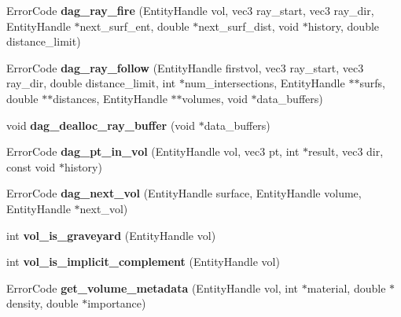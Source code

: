 \begin{DoxyCompactItemize}
\item 
\hypertarget{namespacepyne_a64c30defae1f7780ea4a3e1cb16a7a79}{Error\-Code {\bfseries dag\-\_\-ray\-\_\-fire} (Entity\-Handle vol, vec3 ray\-\_\-start, vec3 ray\-\_\-dir, Entity\-Handle $\ast$next\-\_\-surf\-\_\-ent, double $\ast$next\-\_\-surf\-\_\-dist, void $\ast$history, double distance\-\_\-limit)}\label{namespacepyne_a64c30defae1f7780ea4a3e1cb16a7a79}

\item 
\hypertarget{namespacepyne_afc692d9c804c22e7e6b3a30d2d852296}{Error\-Code {\bfseries dag\-\_\-ray\-\_\-follow} (Entity\-Handle firstvol, vec3 ray\-\_\-start, vec3 ray\-\_\-dir, double distance\-\_\-limit, int $\ast$num\-\_\-intersections, Entity\-Handle $\ast$$\ast$surfs, double $\ast$$\ast$distances, Entity\-Handle $\ast$$\ast$volumes, void $\ast$data\-\_\-buffers)}\label{namespacepyne_afc692d9c804c22e7e6b3a30d2d852296}

\item 
\hypertarget{namespacepyne_a9451bba0ed3cd9857c7452cec04ab031}{void {\bfseries dag\-\_\-dealloc\-\_\-ray\-\_\-buffer} (void $\ast$data\-\_\-buffers)}\label{namespacepyne_a9451bba0ed3cd9857c7452cec04ab031}

\item 
\hypertarget{namespacepyne_ae69cdb5021f7dd38def0bbebaa3a99b3}{Error\-Code {\bfseries dag\-\_\-pt\-\_\-in\-\_\-vol} (Entity\-Handle vol, vec3 pt, int $\ast$result, vec3 dir, const void $\ast$history)}\label{namespacepyne_ae69cdb5021f7dd38def0bbebaa3a99b3}

\item 
\hypertarget{namespacepyne_a83bf77ef33027053fa8ddec223554641}{Error\-Code {\bfseries dag\-\_\-next\-\_\-vol} (Entity\-Handle surface, Entity\-Handle volume, Entity\-Handle $\ast$next\-\_\-vol)}\label{namespacepyne_a83bf77ef33027053fa8ddec223554641}

\item 
\hypertarget{namespacepyne_a7844def8817d3880424ed61a474ec8ab}{int {\bfseries vol\-\_\-is\-\_\-graveyard} (Entity\-Handle vol)}\label{namespacepyne_a7844def8817d3880424ed61a474ec8ab}

\item 
\hypertarget{namespacepyne_ab3a6e65aa714fb05584dcbe5fb4e67c3}{int {\bfseries vol\-\_\-is\-\_\-implicit\-\_\-complement} (Entity\-Handle vol)}\label{namespacepyne_ab3a6e65aa714fb05584dcbe5fb4e67c3}

\item 
\hypertarget{namespacepyne_a0068d2c04f0b12f020479176ded0ca99}{Error\-Code {\bfseries get\-\_\-volume\-\_\-metadata} (Entity\-Handle vol, int $\ast$material, double $\ast$density, double $\ast$importance)}\label{namespacepyne_a0068d2c04f0b12f020479176ded0ca99}


\end{DoxyCompactItemize}
